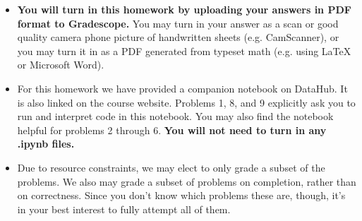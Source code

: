 \documentclass[addpoints, 12pt]{exam}
\begin{document}


\begin{itemize}
    \item \textbf{You will turn in this homework by uploading your answers in PDF format to Gradescope.} You may turn in your answer as a scan or good quality camera phone picture of handwritten sheets (e.g. CamScanner), or you may turn it in as a PDF generated from typeset math (e.g. using LaTeX or Microsoft Word).
    \item For this homework we have provided a companion notebook on DataHub. It is also linked on the course website. Problems 1, 8, and 9 explicitly ask you to run and interpret code in this notebook. You may also find the notebook helpful for problems 2 through 6. \textbf{You will not need to turn in any .ipynb files.}
    \item Due to resource constraints, we may elect to only grade a subset of the problems. We also may grade a subset of problems on completion, rather than on correctness. Since you don’t know which problems these are, though, it’s in your best interest to fully attempt all of them.
\end{itemize}

   

\vspace{-2em}
\end{document}
